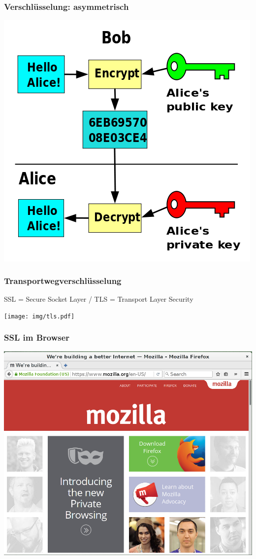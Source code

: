\documentclass[12pt]{beamer}
\begin{document}
\begin{frame}
    \frametitle{Verschlüsselung: asymmetrisch}
    \includegraphics[height=0.7\textheight]{img/asym_encryption.png}
\end{frame}

\begin{frame}
    \frametitle{Transportwegverschlüsselung}
      SSL = Secure Socket Layer / TLS = Transport Layer Security
    \vfill
    \begin{center}
      \texttt{[image: img/tls.pdf]}
    \end{center}
\end{frame}

\begin{frame}
    \frametitle{SSL im Browser}
    \begin{center}
	\includegraphics[height=0.7\textheight]{img/ssl_special.png}
    \end{center}
\end{frame}
\end{document}
